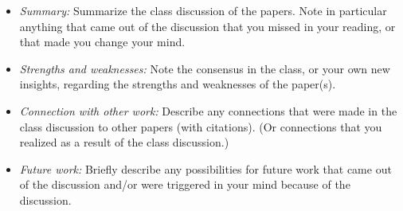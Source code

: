 \documentclass[letterpaper,twocolumn,10pt]{article}
\begin{document}
\begin{itemize}

\item {\it Summary:} Summarize the class discussion of the papers. Note in
particular anything that came out of the discussion that you missed in your
reading, or that made you change your mind. 

\item {\it Strengths and weaknesses:} Note the consensus
in the class, or your own new insights, regarding the strengths and
weaknesses of the paper(s).

\item {\it Connection with other work:} Describe any connections that were made in
the class discussion to other papers (with citations). (Or connections that you realized
as a result of the class discussion.)

\item {\it Future work:} Briefly describe any possibilities
for future work that came out of the discussion and/or were triggered
in your mind because of the discussion.

\end{itemize}

%  
%  
\end{document}
